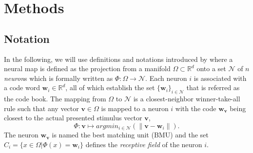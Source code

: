\section{Methods}

\subsection{Notation}

In the following, we will use definitions and notations introduced by \citep{rougier:2011} where a neural map is defined as the projection from a manifold $\Omega \subset \mathbb{R}^d$ onto a set $\mathcal{N}$ of $n$ {\em  neuron}s which is formally written as $\Phi : \Omega \rightarrow \mathcal{N}$. Each neuron $i$ is associated with a code word $\mathbf{w}_i \in \mathbb{R}^d$, all of which establish the set  $\{\mathbf{w}_i\}_{i \in   \mathcal{N}}$ that is referred as the code book. The mapping from $\Omega$ to $\mathcal{N}$ is a closest-neighbor winner-take-all rule such that any vector $\mathbf{v} \in \Omega$ is mapped to a neuron $i$ with the code $\mathbf{w}_\mathbf{v}$ being closest to the actual presented stimulus vector $\mathbf{v}$,
\begin{equation}
\Phi : \mathbf{v} \mapsto argmin_{i \in \mathcal{N}} (\lVert \mathbf{v} -
\mathbf{w}_i \rVert).
\label{eq:psi}
\end{equation}
The neuron $\mathbf{w}_\mathbf{v}$ is named the best matching unit (BMU) and the set $C_i = \{x \in \Omega | \Phi(x) = \mathbf{w}_i \}$ defines the {\em receptive field} of the neuron $i$.




